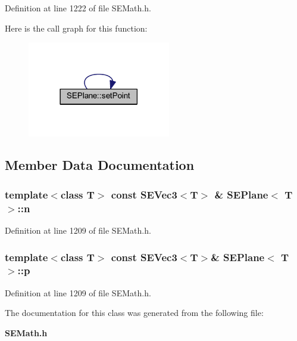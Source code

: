 Definition at line 1222 of file S\+E\+Math.\+h.



Here is the call graph for this function\+:
\nopagebreak
\begin{figure}[H]
\begin{center}
\leavevmode
\includegraphics[width=177pt]{class_s_e_plane_af5393b0e60442d69f2e4c7bf042073ae_cgraph}
\end{center}
\end{figure}




\subsection{Member Data Documentation}
\subsubsection[{n}]{\setlength{\rightskip}{0pt plus 5cm}template$<$class T$>$ const {\bf S\+E\+Vec3}$<$T$>$ \& {\bf S\+E\+Plane}$<$ T $>$\+::n}\label{class_s_e_plane_ae0010fe35997cd44270c02b5a9d0ce47}


Definition at line 1209 of file S\+E\+Math.\+h.

\subsubsection[{p}]{\setlength{\rightskip}{0pt plus 5cm}template$<$class T$>$ const {\bf S\+E\+Vec3}$<$T$>$\& {\bf S\+E\+Plane}$<$ T $>$\+::p}\label{class_s_e_plane_a374a410295d5d74f14e51627efb3b39b}


Definition at line 1209 of file S\+E\+Math.\+h.



The documentation for this class was generated from the following file\+:\begin{DoxyCompactItemize}
\item 
{\bf S\+E\+Math.\+h}\end{DoxyCompactItemize}
